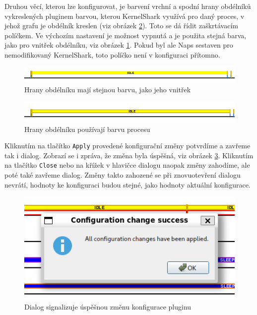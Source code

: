 Druhou věcí, kterou lze konfigurovat, je barvení vrchní a spodní hrany obdélníků vykreslených pluginem barvou, kterou KernelShark využívá pro daný proces, v jehož grafu je obdélník kreslen (viz obrázek \ref{naps-task-col}). Toto se dá řídit zaškrtávacím políčkem. Ve výchozím nastavení je možnost vypnutá a je použita stejná barva, jako pro vnitřek obdélníku, viz obrázek \ref{naps-def-col}. Pokud byl ale Naps sestaven pro nemodifikovaný KernelShark, toto políčko není v konfiguraci přítomno.

\begin{figure}[p]\centering
    \includegraphics[width=140mm]{img/Naps/NapsDefaultColors}
    \caption{Hrany obdélníku mají stejnou barvu, jako jeho vnitřek}
    \label{naps-def-col}
\end{figure}

\begin{figure}[p]\centering
    \includegraphics[width=140mm]{img/Naps/NapsTaskLikeColors}
    \caption{Hrany obdélníku používají barvu procesu}
    \label{naps-task-col}
\end{figure}

Kliknutím na tlačítko \texttt{Apply} provedené konfigurační změny potvrdíme a zavřeme tak i dialog. Zobrazí se i zpráva, že změna byla úspěšná, viz obrázek \ref{naps-cfg-succ}. Kliknutím na tlačítko \texttt{Close} nebo na křížek v hlavičce dialogu naopak změny zahodíme, ale poté také zavřeme dialog. Změny takto zahozené se při znovuotevření dialogu nevrátí, hodnoty ke konfiguraci budou stejné, jako hodnoty aktuální konfigurace.

\begin{figure}[p]\centering
    \includegraphics[width=140mm]{img/Naps/NapsConfigSuccess}
    \caption{Dialog signalizuje úspěšnou změnu konfigurace pluginu}
    \label{naps-cfg-succ}
\end{figure}

